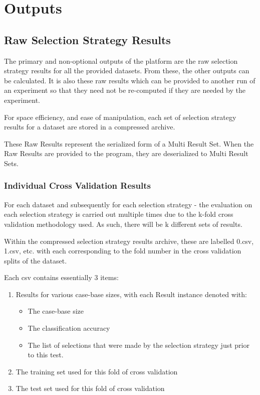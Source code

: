 \documentclass[a4paper,11pt]{report}
\begin{document}
\section{Outputs}

\subsection{Raw Selection Strategy Results}
The primary and non-optional outputs of the platform are the raw selection strategy results for all the provided datasets. From these, the other outputs can be calculated. It is also these raw results which can be provided to another run of an experiment so that they need not be re-computed if they are needed by the experiment. 

For space efficiency, and ease of manipulation, each set of selection strategy results for a dataset are stored in a compressed archive.

These Raw Results represent the serialized form of a Multi Result Set. When the Raw Results are provided to the program, they are deserialized to Multi Result Sets.

\subsubsection{Individual Cross Validation Results}
For each dataset and subsequently for each selection strategy - the evaluation on each selection strategy is carried out multiple times due to the k-fold cross validation methodology used. As such, there will be k different sets of results. 

Within the compressed selection strategy results archive, these are labelled 0.csv, 1.csv, etc. with each corresponding to the fold number in the cross validation splits of the dataset.

Each csv contains essentially 3 items:

\begin{enumerate}
	\item Results for various case-base sizes, with each Result instance denoted with:
		\begin{itemize}
			\item The case-base size
			\item The classification accuracy
			\item The list of selections that were made by the selection strategy just prior to this test.
		\end{itemize}
	\item The training set used for this fold of cross validation
	\item The test set used for this fold of cross validation
\end{enumerate}
\end{document}
